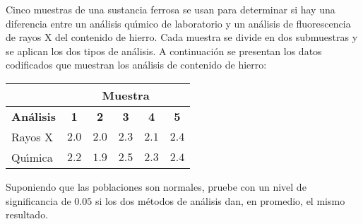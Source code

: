 \begin{enunciado}
 Cinco muestras de una sustancia ferrosa se usan para determinar si hay una diferencia entre un an\'alisis qu\'{\i}mico de laboratorio y un an\'alisis de fluorescencia de rayos X del contenido de hierro. Cada muestra se divide en dos submuestras y se aplican los dos tipos de an\'alisis. A continuaci\'on se presentan los datos codificados que muestran los an\'alisis de contenido de hierro:
 \begin{center}
  \begin{tabular}{l|ccccc}
   & \multicolumn{5}{c}{\textbf{Muestra}} \\
   \hline 
   \textbf{An\'alisis} & \textbf{1} & \textbf{2} & \textbf{3} & \textbf{4} & \textbf{5} \\
   \hline 
   Rayos X & $2.0$ & $2.0$ & $2.3$ & $2.1$ & $2.4$ \\
   Qu\'{\i}mica & $2.2$ & $1.9$ & $2.5$ & $2.3$ & $2.4$
  \end{tabular}
 \end{center}
 Suponiendo que las poblaciones son normales, pruebe con un nivel de significancia de $0.05$ si los dos m\'etodos de an\'alisis dan, en promedio, el mismo resultado.
\end{enunciado}

